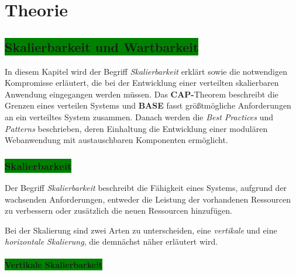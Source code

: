 \chapter{Theorie}
\section{\colorbox{green}{Skalierbarkeit und Wartbarkeit}}

In diesem Kapitel wird der Begriff \textit{Skalierbarkeit} erklärt sowie die notwendigen Kompromisse erläutert, die bei der Entwicklung einer verteilten skalierbaren Anwendung eingegangen werden müssen. Das \textbf{CAP-}Theorem beschreibt die Grenzen eines verteilen Systems und \textbf{BASE} fasst größtmögliche Anforderungen an ein verteiltes System zusammen. Danach werden die \textit{Best Practices} und \textit{Patterns} beschrieben, deren Einhaltung die Entwicklung einer modulären Webanwendung mit austauschbaren Komponenten ermöglicht. 

\subsection{\colorbox{green}{Skalierbarkeit}}\label{scale}
Der Begriff \textit{Skalierbarkeit} beschreibt die Fähigkeit eines Systems, aufgrund der wachsenden Anforderungen, entweder die Leistung der vorhandenen Ressourcen zu verbessern oder zusätzlich die neuen Ressourcen hinzufügen. %

Bei der Skalierung sind zwei Arten zu unterscheiden, eine \textit{vertikale} und eine \textit{horizontale Skalierung}, die demnächst näher erläutert wird.

\subsubsection{\colorbox{green}{Vertikale Skalierbarkeit}}

